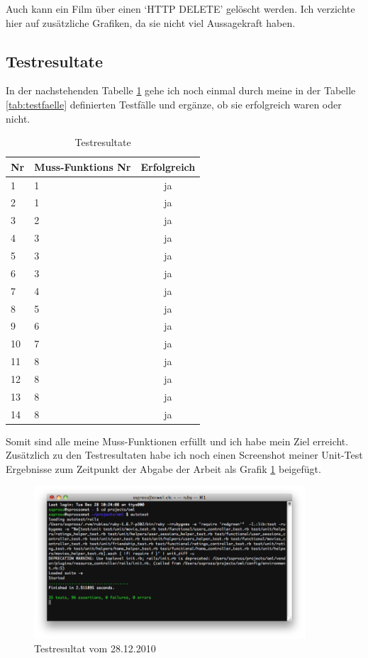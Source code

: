 \clearpage

Auch kann ein Film über einen `HTTP DELETE' gelöscht werden. Ich verzichte
hier auf zusätzliche Grafiken, da sie nicht viel Aussagekraft haben.

\subsection{Testresultate}
In der nachstehenden Tabelle \ref{tab:testresultate} gehe ich noch einmal
durch meine in der Tabelle \ref{tab:testfaelle} definierten Testfälle
und ergänze, ob sie erfolgreich waren oder nicht.

\begin{table}[ht]
\begin{center}
    \begin{tabular}{llc}
        \toprule Nr & Muss-Funktions Nr & Erfolgreich \\
        \midrule 1 & 1 & ja \\
        \midrule 2 & 1 & ja \\
        \midrule 3 & 2 & ja \\
        \midrule 4 & 3 & ja \\
        \midrule 5 & 3 & ja \\
        \midrule 6 & 3 & ja \\
        \midrule 7 & 4 & ja \\
        \midrule 8 & 5 & ja \\
        \midrule 9 & 6 & ja \\
        \midrule 10 & 7 & ja \\
        \midrule 11 & 8 & ja \\
        \midrule 12 & 8 & ja \\
        \midrule 13 & 8 & ja \\
        \midrule 14 & 8 & ja \\
        \bottomrule
    \end{tabular}
    \caption{Testresultate}
    \label{tab:testresultate}
\end{center}
\end{table}

Somit sind alle meine Muss-Funktionen erfüllt und ich habe mein Ziel erreicht.
Zusätzlich zu den Testresultaten habe ich noch einen Screenshot meiner
Unit-Test Ergebnisse zum Zeitpunkt der Abgabe der Arbeit als Grafik \ref{unit_testresultate}
beigefügt.

\begin{figure}[ht]
    \begin{center}
        \includegraphics[width=0.9\textwidth,angle=0]{./bilder/testresultate.png}
        \caption{Testresultat vom 28.12.2010}
        \label{unit_testresultate}
    \end{center}
\end{figure}